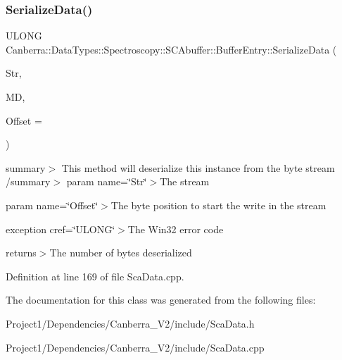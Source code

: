 \subsubsection{\texorpdfstring{Serialize\+Data()}{SerializeData()}}
{\footnotesize\ttfamily U\+L\+O\+NG Canberra\+::\+Data\+Types\+::\+Spectroscopy\+::\+S\+C\+Abuffer\+::\+Buffer\+Entry\+::\+Serialize\+Data (\begin{DoxyParamCaption}\item[{\hyperlink{class_canberra_1_1_utility_1_1_core_1_1_byte_stream}{Canberra\+::\+Utility\+::\+Core\+::\+Byte\+Stream} \&}]{Str,  }\item[{const \hyperlink{class_canberra_1_1_serialization_1_1_meta_data}{Canberra\+::\+Serialization\+::\+Meta\+Data} \&}]{MD,  }\item[{const L\+O\+NG}]{Offset = {} }\end{DoxyParamCaption})}

summary$>$ This method will deserialize this instance from the byte stream /summary$>$ param name=\char`\"{}\+Str\char`\"{}$>$The stream

param name=\char`\"{}\+Offset\char`\"{}$>$The byte position to start the write in the stream

exception cref=\char`\"{}\+U\+L\+O\+N\+G\char`\"{}$>$The Win32 error code

returns$>$The number of bytes deserialized

Definition at line 169 of file Sca\+Data.\+cpp.



The documentation for this class was generated from the following files\+:\begin{DoxyCompactItemize}
\item 
Project1/\+Dependencies/\+Canberra\+\_\+\+V2/include/Sca\+Data.\+h\item 
Project1/\+Dependencies/\+Canberra\+\_\+\+V2/include/Sca\+Data.\+cpp\end{DoxyCompactItemize}
